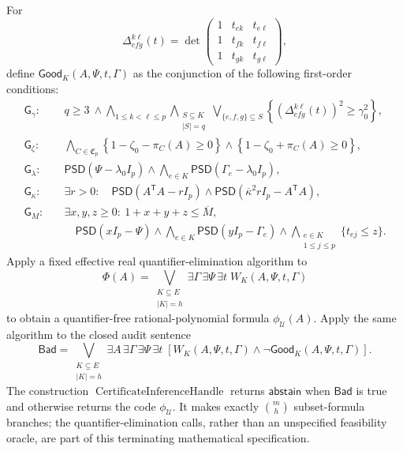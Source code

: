 For
\[
 \Delta_{efg}^{k\ell}(t)=
 \det
 \begin{pmatrix}
  1&t_{ek}&t_{e\ell}\\
  1&t_{fk}&t_{f\ell}\\
  1&t_{gk}&t_{g\ell}
 \end{pmatrix},
\]
define \(\mathsf{Good}_K(A,\Psi,t,\Gamma)\) as the conjunction of the following first-order conditions:
\[
\begin{aligned}
 \mathsf G_\gamma:
 &\quad q\geq3\ \wedge
 \bigwedge_{1\leq k<\ell\leq p}
 \bigwedge_{\substack{S\subseteq K\\|S|=q}}
 \bigvee_{\{e,f,g\}\subseteq S}
 \left\{(\Delta_{efg}^{k\ell}(t))^2\geq\gamma_0^2\right\},\\
 \mathsf G_\zeta:
 &\quad \bigwedge_{C\in\mathfrak C_p}
 \left\{1-\zeta_0-\pi_C(A)\geq0\right\}
 \wedge
 \left\{1-\zeta_0+\pi_C(A)\geq0\right\},\\
 \mathsf G_\lambda:
 &\quad \mathsf{PSD}(\Psi-\lambda_0I_p)
 \wedge\bigwedge_{e\in K}\mathsf{PSD}(\Gamma_e-\lambda_0I_p),\\
 \mathsf G_\kappa:
 &\quad \exists r>0:\quad
 \mathsf{PSD}(A^{\mathsf T}A-rI_p)
 \wedge
 \mathsf{PSD}(\overline\kappa^{2}rI_p-A^{\mathsf T}A),\\
 \mathsf G_M:
 &\quad \exists x,y,z\geq0:\ 1+x+y+z\leq\overline M,\\
 &\qquad \mathsf{PSD}(xI_p-\Psi)
 \wedge\bigwedge_{e\in K}\mathsf{PSD}(yI_p-\Gamma_e)
 \wedge\bigwedge_{\substack{e\in K\\1\leq j\leq p}}\{t_{ej}\leq z\}.
\end{aligned}
\]
Apply a fixed effective real quantifier-elimination algorithm to
\[
 \Phi(A)=
 \bigvee_{\substack{K\subseteq E\\|K|=h}}
 \exists\Gamma\,\exists\Psi\,\exists t\;W_K(A,\Psi,t,\Gamma)
\]
to obtain a quantifier-free rational-polynomial formula \(\phi_{\mathcal U}(A)\).  Apply the same algorithm to the closed audit sentence
\[
 \mathsf{Bad}=
 \bigvee_{\substack{K\subseteq E\\|K|=h}}
 \exists A\,\exists\Gamma\,\exists\Psi\,\exists t\;
 \left[W_K(A,\Psi,t,\Gamma)
 \wedge\neg\mathsf{Good}_K(A,\Psi,t,\Gamma)\right].
\]
The construction \(\operatorname{CertificateInferenceHandle}\) returns \(\mathsf{abstain}\) when \(\mathsf{Bad}\) is true and otherwise returns the code \(\phi_{\mathcal U}\).  It makes exactly \(\binom mh\) subset-formula branches; the quantifier-elimination calls, rather than an unspecified feasibility oracle, are part of this terminating mathematical specification.